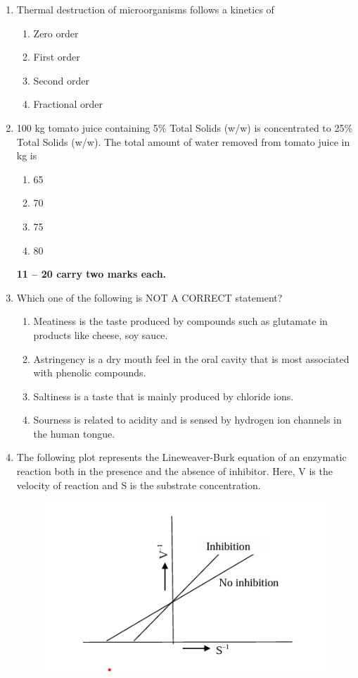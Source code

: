 \documentclass[journal,12pt,onecolumn]{IEEEtran}
\begin{document}
\begin{enumerate}[label=\arabic*.]
\item Thermal destruction of microorganisms follows a kinetics of
\begin{multicols}{4}
\begin{enumerate}[label=(\Alph*)]
\item Zero order
\item First order
\item Second order
\item Fractional order
\end{enumerate}
\end{multicols}

\item 100 kg tomato juice containing 5\% Total Solids (w/w) is concentrated to 25\% Total Solids (w/w). The total amount of water removed from tomato juice in kg is
\begin{multicols}{4}
\begin{enumerate}[label=(\Alph*)]
\item 65
\item 70
\item 75
\item 80
\end{enumerate}
\end{multicols}

\noindent \textbf{ 11 --  20 carry two marks each.}

\item Which one of the following is NOT A CORRECT statement?
\begin{enumerate}[label=(\Alph*)]
\item Meatiness is the taste produced by compounds such as glutamate in products like cheese, soy sauce.
\item Astringency is a dry mouth feel in the oral cavity that is most associated with phenolic compounds.
\item Saltiness is a taste that is mainly produced by chloride ions.
\item Sourness is related to acidity and is sensed by hydrogen ion channels in the human tongue.
\end{enumerate}

\item The following plot represents the Lineweaver-Burk equation of an enzymatic reaction both in the presence and the absence of inhibitor. Here, V is the velocity of reaction and S is the substrate concentration.

\begin{figure}[H]
    \centering
    \includegraphics[width=0.7\columnwidth]{FIG/M-12.png}
    \caption*{}
    \label{fig:M-12}
\end{figure}


\end{enumerate}
\end{document}
